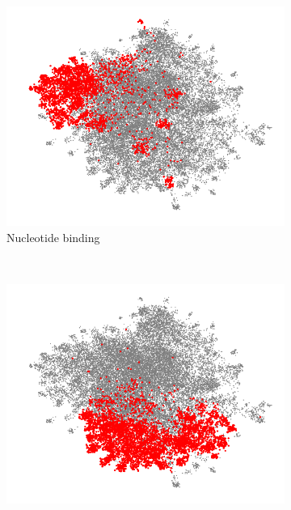 \begin{figure}[t!]
    \centering
    \begin{subfigure}[t]{0.3\textwidth}
    \vskip 0pt
        \includegraphics[width=\textwidth]{nucleotidebinding}
        \caption{Nucleotide binding}
        \label{fig:gull}
    \end{subfigure}
    ~ %
    \begin{subfigure}[t]{0.3\textwidth}
    \vskip 0pt
        \includegraphics[width=\textwidth]{ribosome}

\end{subfigure}
\end{figure}
